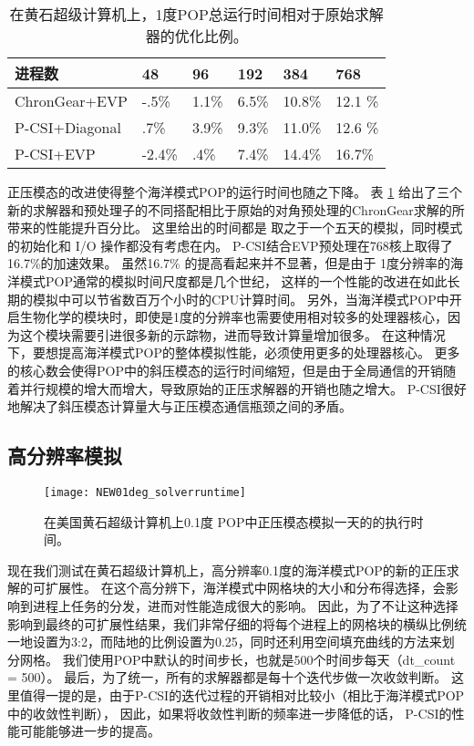 \begin{table}[ht]
\begin{center}
\caption{在黄石超级计算机上，1度POP总运行时间相对于原始求解器的优化比例。 \label{tab:improve_1}}
\begin{tabular}{|l||l|l|l|l|l|}
\hline
进程数 & 48  & 96  & 192 & 384 & 768\\\hline
\hline
ChronGear+EVP & -.5\% & 1.1\%  & 6.5\% & 10.8\%  & 12.1 \% \\\hline
P-CSI+Diagonal  & .7\% &3.9\% &9.3\%  &11.0\% & 12.6 \% \\\hline
P-CSI+EVP	      &-2.4\% & .4\%	& 7.4\%  & 14.4\% & 16.7\%\\\hline
\end{tabular}
\end{center}
\end{table}
正压模态的改进使得整个海洋模式POP的运行时间也随之下降。
表 \ref{tab:improve_1} 给出了三个新的求解器和预处理子的不同搭配相比于原始的对角预处理的ChronGear求解的所带来的性能提升百分比。 
这里给出的时间都是 取之于一个五天的模拟，同时模式的初始化和 I/O 操作都没有考虑在内。 
P-CSI结合EVP预处理在768核上取得了16.7\%的加速效果。
虽然16.7\% 的提高看起来并不显著，但是由于 1度分辨率的海洋模式POP通常的模拟时间尺度都是几个世纪， 这样的一个性能的改进在如此长期的模拟中可以节省数百万个小时的CPU计算时间。 
另外，当海洋模式POP中开启生物化学的模块时，即使是1度的分辨率也需要使用相对较多的处理器核心，因为这个模块需要引进很多新的示踪物，进而导致计算量增加很多。 
在这种情况下，要想提高海洋模式POP的整体模拟性能，必须使用更多的处理器核心。
更多的核心数会使得POP中的斜压模态的运行时间缩短，但是由于全局通信的开销随着并行规模的增大而增大，导致原始的正压求解器的开销也随之增大。 
P-CSI很好地解决了斜压模态计算量大与正压模态通信瓶颈之间的矛盾。

\subsection{高分辨率模拟}
\label{precond:exp:high}

\begin {figure}
\centering
\texttt{[image: NEW01deg\_solverruntime]}
\caption []{ 在美国黄石超级计算机上0.1度 POP中正压模态模拟一天的的执行时间。\label {fig:runtime01_time}}
\end {figure}
现在我们测试在黄石超级计算机上，高分辨率0.1度的海洋模式POP的新的正压求解的可扩展性。 
在这个高分辨下，海洋模式中网格块的大小和分布得选择，会影响到进程上任务的分发，进而对性能造成很大的影响。 
因此，为了不让这种选择影响到最终的可扩展性结果，我们非常仔细的将每个进程上的网格块的横纵比例统一地设置为3:2，而陆地的比例设置为0.25，同时还利用空间填充曲线的方法来划分网格。 
我们使用POP中默认的时间步长，也就是500个时间步每天（dt\_count = 500）。 
最后，为了统一，所有的求解器都是每十个迭代步做一次收敛判断。 
这里值得一提的是，由于P-CSI的迭代过程的开销相对比较小（相比于海洋模式POP中的收敛性判断）， 因此，如果将收敛性判断的频率进一步降低的话， P-CSI的性能可能能够进一步的提高。 
 

